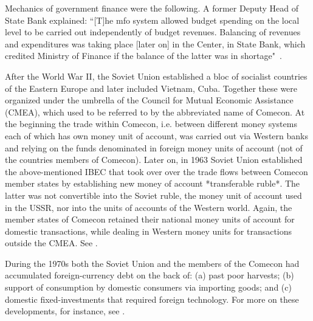 Mechanics of government finance were the following. A former Deputy Head
of State Bank explained: ``[T]he \ac{mfo} system allowed budget spending on
the local level to be carried out independently of budget revenues.
Balancing of revenues and expenditures was taking place [later on] in
the Center, in State Bank, which credited Ministry of Finance if the
balance of the latter was in shortage"~\citep[p.~16]{krotov2008b}.

After the World War II, the Soviet Union established a bloc of socialist
countries of the Eastern Europe and later included Vietnam, Cuba.
Together these were organized under the umbrella of the Council for
Mutual Economic Assistance (CMEA), which used to be referred to by the
abbreviated name of Comecon. At the beginning the trade within Comecon,
i.e. between different money systems each of which has own money unit of
account, was carried out via Western banks and relying on the funds
denominated in foreign money units of account (not of the countries
members of Comecon). Later on, in 1963 Soviet Union established the
above-mentioned IBEC that took over over the trade flows between Comecon
member states by establishing new money of account *transferable
ruble*. The latter was not convertible into the Soviet ruble, the money
unit of account used in the USSR, nor into the units of accounts of the
Western world. Again, the member states of Comecon retained their
national money units of account for domestic transactions, while dealing
in Western money units for transactions outside the CMEA. See \citep{vincze,kalinski}.

During the 1970s both the Soviet Union and the members of the Comecon
had accumulated foreign-currency debt on the back of: (a) past poor
harvests; (b) support of consumption by domestic consumers via importing
goods; and (c) domestic fixed-investments that required foreign
technology. For more on these developments, for instance, see \citep{coombs1976,gaidar2002,harold}.

